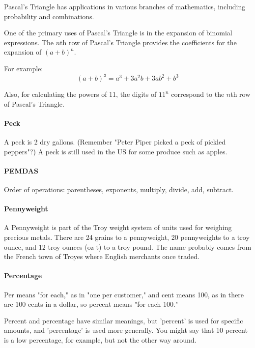 \documentclass[12pt]{article}
\begin{document}
{\begin{center}
\end{center}

Pascal's Triangle has applications in various branches of mathematics, including probability and combinations.

One of the primary uses of Pascal's Triangle is in the expansion of binomial expressions. The \(n\)th row of Pascal's Triangle provides the coefficients for the expansion of \((a + b)^n\).

For example:
\[ (a + b)^3 = a^3 + 3a^2b + 3ab^2 + b^3 \]

Also, for calculating the powers of 11, the digits of \(11^n\) correspond to the \(n\)th row of Pascal's Triangle.

\paragraph{Peck}
A peck is 2 dry gallons. (Remember "Peter Piper picked a peck of pickled peppers"?) A peck is still used in the US for some produce such as apples.

\paragraph{PEMDAS}
Order of operations: parentheses, exponents, multiply, divide, add, subtract.

\paragraph{Pennyweight}
A Pennyweight is part of the Troy weight system of units used for weighing precious metals. There are 24 grains to a pennyweight, 20 pennyweights to a troy ounce, and 12 troy ounces (oz t) to a troy pound. The name probably comes from the French town of Troyes where English merchants once traded.

\paragraph{Percentage}
Per means "for each," as in "one per customer," and cent means 100, as in there are 100 cents in a dollar, so percent means "for each 100."

Percent and percentage have similar meanings, but 'percent' is used for specific amounts, and 'percentage' is used more generally. You might say that 10 percent is a low percentage, for example, but not the other way around.

}
\end{document}
